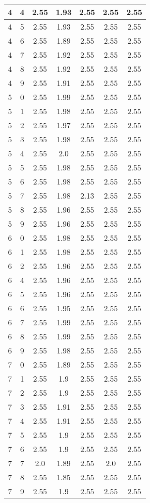 \begin{longtable}{|c|c||c||c|c||c|c|}
	4 & 4 & 2.55 & 1.93 & 2.55 & 2.55 & 2.55 \\ \hline
	4 & 5 & 2.55 & 1.93 & 2.55 & 2.55 & 2.55 \\ \hline
	4 & 6 & 2.55 & 1.89 & 2.55 & 2.55 & 2.55 \\ \hline
	4 & 7 & 2.55 & 1.92 & 2.55 & 2.55 & 2.55 \\ \hline
	4 & 8 & 2.55 & 1.92 & 2.55 & 2.55 & 2.55 \\ \hline
	4 & 9 & 2.55 & 1.91 & 2.55 & 2.55 & 2.55 \\ \hline
	5 & 0 & 2.55 & 1.99 & 2.55 & 2.55 & 2.55 \\ \hline
	5 & 1 & 2.55 & 1.98 & 2.55 & 2.55 & 2.55 \\ \hline
	5 & 2 & 2.55 & 1.97 & 2.55 & 2.55 & 2.55 \\ \hline
	5 & 3 & 2.55 & 1.98 & 2.55 & 2.55 & 2.55 \\ \hline
	5 & 4 & 2.55 & 2.0 & 2.55 & 2.55 & 2.55 \\ \hline
	5 & 5 & 2.55 & 1.98 & 2.55 & 2.55 & 2.55 \\ \hline
	5 & 6 & 2.55 & 1.98 & 2.55 & 2.55 & 2.55 \\ \hline
	5 & 7 & 2.55 & 1.98 & 2.13 & 2.55 & 2.55 \\ \hline
	5 & 8 & 2.55 & 1.96 & 2.55 & 2.55 & 2.55 \\ \hline
	5 & 9 & 2.55 & 1.96 & 2.55 & 2.55 & 2.55 \\ \hline
	6 & 0 & 2.55 & 1.98 & 2.55 & 2.55 & 2.55 \\ \hline
	6 & 1 & 2.55 & 1.98 & 2.55 & 2.55 & 2.55 \\ \hline
	6 & 2 & 2.55 & 1.96 & 2.55 & 2.55 & 2.55 \\ \hline
	6 & 4 & 2.55 & 1.96 & 2.55 & 2.55 & 2.55 \\ \hline
	6 & 5 & 2.55 & 1.96 & 2.55 & 2.55 & 2.55 \\ \hline
	6 & 6 & 2.55 & 1.95 & 2.55 & 2.55 & 2.55 \\ \hline
	6 & 7 & 2.55 & 1.99 & 2.55 & 2.55 & 2.55 \\ \hline
	6 & 8 & 2.55 & 1.99 & 2.55 & 2.55 & 2.55 \\ \hline
	6 & 9 & 2.55 & 1.98 & 2.55 & 2.55 & 2.55 \\ \hline
	7 & 0 & 2.55 & 1.89 & 2.55 & 2.55 & 2.55 \\ \hline
	7 & 1 & 2.55 & 1.9 & 2.55 & 2.55 & 2.55 \\ \hline
	7 & 2 & 2.55 & 1.9 & 2.55 & 2.55 & 2.55 \\ \hline
	7 & 3 & 2.55 & 1.91 & 2.55 & 2.55 & 2.55 \\ \hline
	7 & 4 & 2.55 & 1.91 & 2.55 & 2.55 & 2.55 \\ \hline
	7 & 5 & 2.55 & 1.9 & 2.55 & 2.55 & 2.55 \\ \hline
	7 & 6 & 2.55 & 1.9 & 2.55 & 2.55 & 2.55 \\ \hline
	7 & 7 & 2.0 & 1.89 & 2.55 & 2.0 & 2.55 \\ \hline
	7 & 8 & 2.55 & 1.85 & 2.55 & 2.55 & 2.55 \\ \hline
	7 & 9 & 2.55 & 1.9 & 2.55 & 2.55 & 2.55 \\ \hline
\end{longtable}
